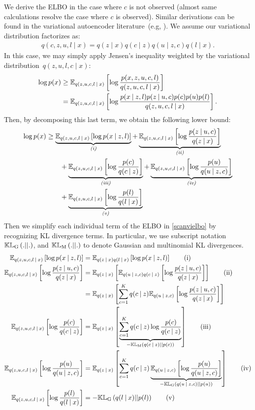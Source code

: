 We derive the ELBO in the case where $c$ is not observed (almost same calculations resolve the case where $c$ is observed). Similar derivations can be found in the variational autoencoder literature~(e.g, \cite{m1m2}). We assume our variational distribution factorizes as:
\begin{align}
    q(c, z, u, l \mid x) = q(z \mid x)q(c \mid z)q(u \mid z, c)q(l \mid x).
\end{align}
In this case, we may simply apply Jensen's inequality weighted by the variational distribution~$q(z, u, l, c \mid x)$:
\begin{align}
    \log p(x) &\geq \mathbb{E}_{q (z, u, c, l \:\lvert\: x)}\left[ \log \frac{p(x, z, u, c, l)}{q (z, u, c, l \:\lvert\: x)} \right] \\
    &= \mathbb{E}_{q (z, u, c, l \:\lvert\: x)}\left[ \log \frac{p(x \:\lvert\: z, l)p(z \:\lvert\: u, c)p(c)p(u)p(l)}{q (z, u, c, l \:\lvert\: x)} \right].
\end{align}
Then, by decomposing this last term, we obtain the following lower bound:
\begin{align}
\begin{split}
    \log p(x) & \geq \underbrace{\mathbb{E}_{q (z, u, c, l \:\lvert\: x)}\left[ \log p(x \:\lvert\: z, l) \right]}_{\text{\emph{(i)}}} + \underbrace{\mathbb{E}_{q (z, u, c, l \:\lvert\: x)}\left[ \log \frac{p(z \:\lvert\: u, c)}{q(z \:\lvert\: x)} \right]}_{\text{\emph{(ii)}}} \\
    & \qquad + \underbrace{\mathbb{E}_{q (z, u, c, l \:\lvert\: x)}\left[ \log \frac{p(c)}{q(c \:\lvert\: z)} \right]}_{\text{\emph{(iii)}}}+ \underbrace{\mathbb{E}_{q (z, u, c, l \:\lvert\: x)}\left[ \log \frac{p(u)}{q(u \:\lvert\: z,c)} \right]}_{\text{\emph{(iv)}}} \\
    & \qquad + \underbrace{\mathbb{E}_{q (z, u, c, l \:\lvert\: x)}\left[ \log \frac{p(l)}{q(l \:\lvert\: x)} \right]}_{\text{\emph{(v)}}}
\end{split}
\label{scanvielbo}
\end{align}
Then we simplify each individual term of the ELBO in \ref{scanvielbo} by recognizing KL divergence terms. In particular, we use subscript notation $\mathbb{KL}_{\text{G}}\left( .\lvert \lvert . \right)$, and $\mathbb{KL}_{\text{M}}\left( .\lvert \lvert . \right)$ to denote Gaussian and multinomial KL divergences.
\begin{align}
    \mathbb{E}_{q (z, u, c, l \:\lvert\: x)}\left[ \log p(x \:\lvert\: z, l) \right] &= \mathbb{E}_{q(z \:\lvert\: x)q(l \:\lvert\: x)}\left[ \log p(x \:\lvert\: z, l) \right] \tag{i}\\
    \mathbb{E}_{q (z, u, c, l \:\lvert\: x)}\left[ \log \frac{p(z \:\lvert\: u, c)}{q(z \:\lvert\: x)} \right] &= \mathbb{E}_{q(z \:\lvert\: x)}\left[ \mathbb{E}_{q(u \:\lvert\: z,c)q(c \:\lvert\: z)}\left[ \log \frac{p(z \:\lvert\: u, c)}{q(z \:\lvert\: x)} \right] \right] \tag{ii}\\
&= \mathbb{E}_{q(z\:\lvert\: x)}\left[ \sum_{c=1}^K q(c \:\lvert\: z) \mathbb{E}_{q(u \:\lvert\: z,c)}\left[ \log \frac{p(z \:\lvert\: u, c)}{q(z \:\lvert\: x)} \right] \right] \notag \\
    \mathbb{E}_{q (z, u, c, l \:\lvert\: x)}\left[ \log \frac{p(c)}{q(c \:\lvert\: z)} \right] &= \mathbb{E}_{q(z \:\lvert\: x)}\left[  \underbrace{\sum_{c=1}^K q(c \:\lvert\: z) \log \frac{p(c)}{q(c \:\lvert\: z)}}_{-\mathbb{KL}_{\text{M}}\left( q(c \:\lvert\: z)\lvert \lvert p(c) \right)}  \right] \tag{iii}\\
    \mathbb{E}_{q (z, u, c, l \:\lvert\: x)}\left[ \log \frac{p(u)}{q(u \:\lvert\: z,c)} \right] &= \mathbb{E}_{q(z \:\lvert\: x)}\left[  \sum_{c=1}^K q(c \:\lvert\: z) \underbrace{\mathbb{E}_{q(u \:\lvert\: z, c)}\left[ \log  \frac{p(u)}{q(u \:\lvert\: z, c)} \right]}_{-\mathbb{KL}_{\text{G}}\left( q(u \:\lvert\: z, c)\lvert \lvert p(u) \right)}  \right] \tag{iv}\\
    \mathbb{E}_{q (z, u, c, l \:\lvert\: x)}\left[ \log \frac{p(l)}{q(l \:\lvert\: x)} \right] &= -\mathbb{KL}_{\text{G}}\left( q(l \:\lvert\: x)\lvert \lvert p(l) \right)  \tag{v}
\end{align} 


